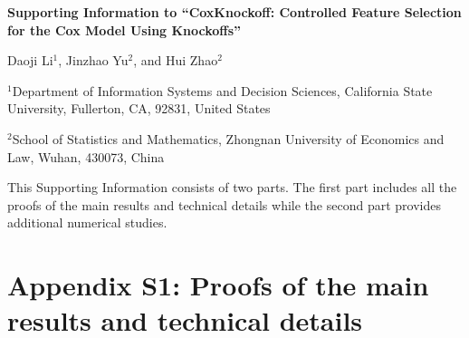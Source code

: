 \documentclass[11pt]{article}
\begin{document}


\newpage
\setcounter{page}{1}




\begin{center}{\bf \Large Supporting Information to ``CoxKnockoff: Controlled Feature Selection for the Cox Model Using Knockoffs''}
	
	
	
	\bigskip
	
	Daoji Li$^1$,  Jinzhao Yu$^2$, and Hui Zhao$^2$
	
	$^1$Department of Information Systems and Decision Sciences, California State University, Fullerton, CA, 92831, United States
	
	$^2$School of Statistics and Mathematics, Zhongnan University of Economics and Law, Wuhan, 430073, China\\
	
	
\end{center}




\setcounter{equation}{0}
\setcounter{table}{0}
\renewcommand{\theequation}{A.\arabic{equation}}
\renewcommand{\thetable}{S\arabic{table}}  




This Supporting Information consists of two parts. The first part includes all the proofs of the main results and technical details while the second part provides additional numerical studies.  
	
	
	\section*{Appendix S1: Proofs of the main results and technical details}\label{App: S1}
	
\end{document}
